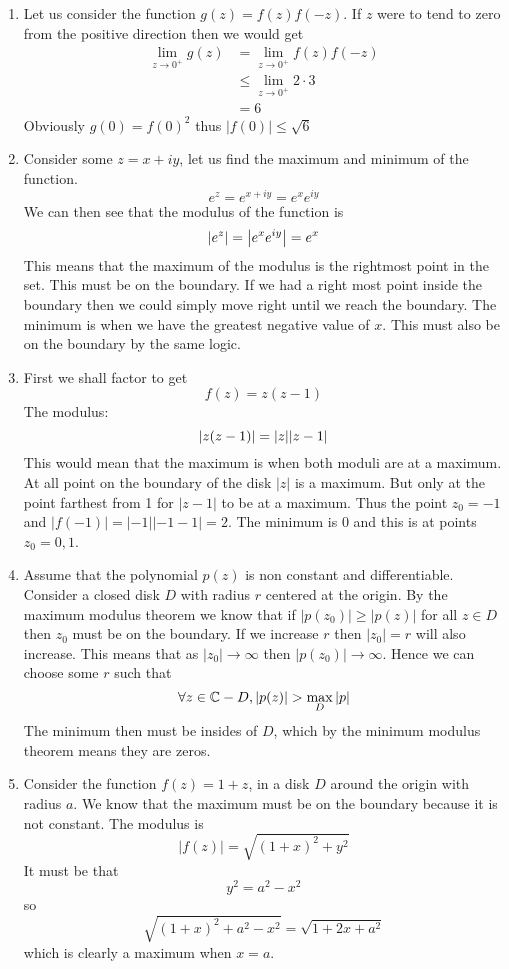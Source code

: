 \documentclass{article}
\begin{document}
  \begin{enumerate}
    \item
      Let us consider the function $g(z)=f(z)f(-z)$. If $z$ were to tend to zero from the positive direction then we would get
      \begin{align*}
        \lim_{z\to0^+}g(z)&=\lim_{z\to0^+}f(z)f(-z)\\
        &\leq\lim_{z\to0^+}2\cdot3\\
        &=6
      \end{align*}
      Obviously $g(0)=f(0)^2$ thus $|f(0)|\leq\sqrt{6}$
    \item
      Consider some $z=x+iy$, let us find the maximum and minimum of the function.
      \[e^z=e^{x+iy}=e^xe^{iy}\]
      We can then see that the modulus of the function is
      \[\left|e^z\right|=\abs*{e^xe^{iy}}=e^x\]
      This means that the maximum of the modulus is the rightmost point in the set. This must be on the boundary. If we had a right most point inside the boundary then we could simply move right until we reach the boundary. The minimum is when we have the greatest negative value of $x$. This must also be on the boundary by the same logic.
    \item
      First we shall factor to get
      \[f(z)=z(z-1)\]
      The modulus:
      \[\abs*{z(z-1)}=\abs{z}\abs{z-1}\]
      This would mean that the maximum is when both moduli are at a maximum. At all point on the boundary of the disk $|z|$ is a maximum. But only at the point farthest from 1 for $|z-1|$ to be at a maximum. Thus the point $z_0=-1$ and $|f(-1)|=|-1||-1-1|=2$. The minimum is 0 and this is at points $z_0=0,1$.
    \item
      Assume that the polynomial $p(z)$ is non constant and differentiable. Consider a closed disk $D$ with radius $r$ centered at the origin. By the maximum modulus theorem we know that if $|p(z_0)|\geq|p(z)|$ for all $z\in D$ then $z_0$ must be on the boundary. If we increase $r$ then $|z_0|=r$ will also increase. This means that as $|z_0|\to\infty$ then $|p(z_0)|\to\infty$. Hence we can choose some $r$ such that
      \[\forall z\in\C-D,|p(z)|>\max_D|p|\]
      The minimum then must be insides of $D$, which by the minimum modulus theorem means they are zeros.
    \item
      Consider the function $f(z)=1+z$, in a disk $D$ around the origin with radius $a$. We know that the maximum must be on the boundary because it is not constant. The modulus is
      \[|f(z)|=\sqrt{(1+x)^2+y^2}\]
      It must be that
      \[y^2=a^2-x^2\]
      so
      \[\sqrt{(1+x)^2+a^2-x^2}=\sqrt{1+2x+a^2}\]
      which is clearly a maximum when $x=a$.
  \end{enumerate}
\end{document}

